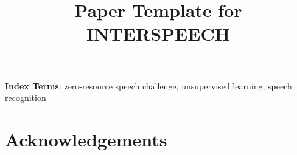 \documentclass[a4paper]{article}
\title{Paper Template for INTERSPEECH}
\begin{document}
\maketitle
% 
\begin{abstract}

\end{abstract}
\noindent\textbf{Index Terms}: zero-resource speech challenge, unsupervised learning, speech recognition







\section{Acknowledgements}

\printbibliography[heading=bibnumbered]
%

%

\end{document}
